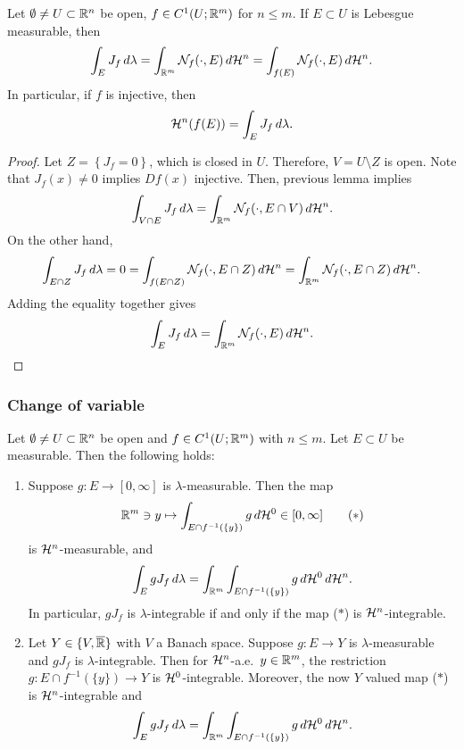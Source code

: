 \documentclass[a4paper]{article}
\begin{document}
\begin{thm}
  Let $\emptyset \neq U \subset \mathbb{R}^n$ be open, $f \in C^1(U;
    \mathbb{R}^m)$ for $n \leq m$. If $E \subset U$ is Lebesgue measurable,
  then
  \[
    \int_E J_f \, d \lambda = \int_{\mathbb{R}^m} \mathcal{N}_f(\cdot, E) \, d \mathcal{H}^n
    = \int_{f(E)} \mathcal{N}_f(\cdot, E) \, d \mathcal{H}^n.
  \]
  In particular, if $f$ is injective, then
  \[
    \mathcal{H}^n (f(E)) = \int_E J_f \, d \lambda.
  \]
\end{thm}

\begin{proof}
  Let $Z = \left\{ J_f = 0 \right\}$, which is closed in $U$. Therefore,
  $V = U \setminus Z$ is open. Note that $J_f(x) \neq 0$ implies $Df(x)$
  injective. Then, previous lemma implies
  \[
    \int_{V \cap E} J_f \, d \lambda
    = \int_{\mathbb{R}^m} \mathcal{N}_f(\cdot, E \cap V) \, d \mathcal{H}^n.
  \]
  On the other hand,
  \[
    \int_{E \cap Z} J_f \, d \lambda = 0
    = \int_{f(E \cap Z)} \mathcal{N}_f (\cdot, E \cap Z) \, d \mathcal{H}^n
    = \int_{\mathbb{R}^m} \mathcal{N}_f(\cdot, E \cap Z) \, d \mathcal{H}^n.
  \]
  Adding the equality together gives
  \[
    \int_E J_f \, d \lambda = \int_{\mathbb{R}^m} \mathcal{N}_f(\cdot, E) \, d \mathcal{H}^n.
  \]
\end{proof}

\subsubsection{Change of variable}

\begin{thm}
  Let $\emptyset \neq U \subset \mathbb{R}^n$ be open and $f \in C^1
    (U; \mathbb{R}^m)$ with $n \leq m$. Let $E \subset U$ be measurable.
  Then the following holds:
  \begin{enumerate}
    \item Suppose $g : E \to [0, \infty]$ is $\lambda$-measurable. Then
          the map
          \[
            \mathbb{R}^m \ni y \mapsto \int_{E \cap f^{-1}(\{y\})}
            g \, d \mathcal{H}^0 \in [0, \infty]
            \tag{$*$}
          \]
          is $\mathcal{H}^n$-measurable, and
          \[
            \int_E g J_f \, d \lambda = \int_{\mathbb{R}^m} \int_{E \cap f^{-1}(\{y\})}
            g \, d \mathcal{H}^0 \, d \mathcal{H}^n.
          \]
          In particular, $g J_f$ is $\lambda$-integrable if and only if
          the map ($*$) is $\mathcal{H}^n$-integrable.

    \item Let $Y \in \{V , \overline{\mathbb{R}}\}$ with $V$ a Banach space. Suppose $g
          : E \to Y$ is $\lambda$-measurable and $g J_f$ is
          $\lambda$-integrable. Then for $\mathcal{H}^n$-a.e.\ $y \in \mathbb{R}^m$, the
          restriction $g : E \cap f^{-1}(\{y\}) \to Y$ is
          $\mathcal{H}^0$-integrable. Moreover, the now $Y$ valued map ($*$) is
          $\mathcal{H}^n$-integrable and
          \[
            \int_E g J_f \, d \lambda = \int_{\mathbb{R}^m}
            \int_{E \cap f^{-1}(\{y\})} g \, d \mathcal{H}^0 \, d \mathcal{H}^n.
          \]
  \end{enumerate}
\end{thm}
\end{document}
